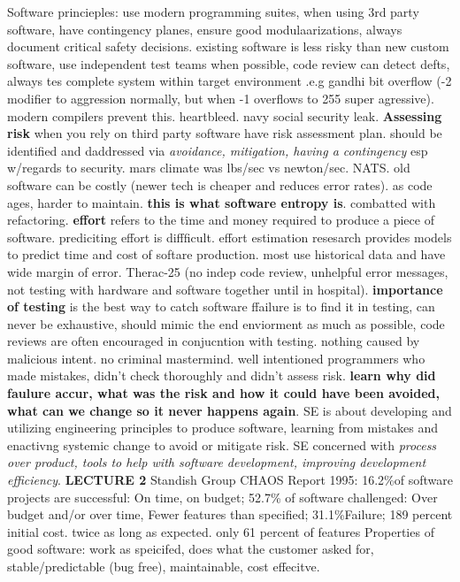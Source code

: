 \documentclass[10pt]{article}
\begin{document}
\begin{landscape}
\begin{multicols*}{6}
Software princieples: use modern programming suites, when using 3rd party software, have contingency planes, ensure good modulaarizations, always document critical safety decisions. existing software is less risky than new custom software, use independent test teams when possible, code review can detect defts, always tes complete system within target environment .e.g gandhi bit overflow (-2 modifier to aggression normally, but when -1 overflows to 255 super agressive). modern compilers prevent this. heartbleed. navy social security leak. \textbf{Assessing risk} when you rely on third party software have risk assessment plan. should be identified and daddressed via \textit{avoidance, mitigation, having a contingency} esp w/regards to security. mars climate was lbs/sec vs newton/sec. NATS. old software can be costly (newer tech is cheaper and reduces error rates). as code ages, harder to maintain. \textbf{this is what software entropy is}. combatted with refactoring. \textbf{effort} refers to the time and money required to produce a piece of software. prediciting effort is diffficult. effort estimation resesarch provides models to predict time and cost of softare production. most use historical data and have wide margin of error. Therac-25 (no indep code review, unhelpful error messages, not testing with hardware and software together until in hospital). \textbf{importance of testing} is the best way to catch software ffailure is to find it in testing, can never be exhaustive, should mimic the end enviorment as much as possible, code reviews are often encouraged in conjucntion with testing. nothing caused by malicious intent. no criminal mastermind. well intentioned programmers who made mistakes, didn't check thoroughly and didn't assess risk. \textbf{learn why did faulure accur, what was the risk and how it could have been avoided, what can we change so it never happens again}. 
SE is about developing and utilizing engineering principles to produce software, learning from mistakes and enactivng systemic change to avoid or mitigate risk. SE concerned with \textit{process over product, tools to help with software development, improving development efficiency}. 
\textbf{LECTURE 2}
Standish Group CHAOS Report 1995:
16.2\%of software projects are successful: On time, on budget;
52.7\% of software challenged: Over budget and/or over time, Fewer features than specified;
31.1\%Failure;
189 percent initial cost. twice as long as expected. only 61 percent of features 
Properties of good software: work as speicifed, does what the customer asked for, stable/predictable (bug free), maintainable, cost effecitve. 

\end{multicols*}
\end{landscape}
\end{document}
